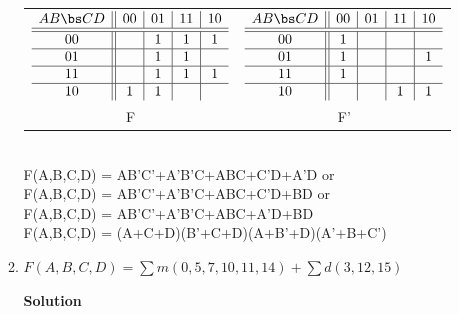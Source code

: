 \begin{enumerate}
\begin{enumerate}
\begin{onlysolution}
{                        \begin{tabular}{cc}
                            $
                            \begin{array} {c||c|c|c|c}
                                A B \bs C D   & 00 & 01 & 11 & 10 \\ \hline \hline
                                00        &    & 1  & 1  & 1  \\ \hline
                                01        &    & 1  & 1  &    \\ \hline
                                11        &    & 1  & 1  & 1  \\ \hline
                                10        & 1  & 1  &    &    \\
                            \end{array}$ &
                            $
                            \begin{array} {c||c|c|c|c}
                                A B \bs C D   & 00 & 01 & 11 & 10 \\ \hline \hline
                                00        & 1  &    &    &    \\ \hline
                                01        & 1  &    &    & 1  \\ \hline
                                11        & 1  &    &    &    \\ \hline
                                10        &    &    & 1  & 1  \\
                            \end{array}$ \\
                            F  & F' \\
                        \end{tabular} \\
                        \SOPmin F(A,B,C,D) = AB'C'+A'B'C+ABC+C'D+A'D  or \\
                        \SOPmin F(A,B,C,D) = AB'C'+A'B'C+ABC+C'D+BD  or \\
                        \SOPmin F(A,B,C,D) = AB'C'+A'B'C+ABC+A'D+BD \\
                        \POSmin F(A,B,C,D) =  (A+C+D)(B'+C+D)(A+B'+D)(A'+B+C')
                    }
                \end{onlysolution}
            \item  $F(A,B,C,D) = \sum m(0,5,7,10,11,14) + \sum d(3,12,15)$

                \begin{onlysolution}  \textbf{Solution} \itshape{

}
\end{onlysolution}
\end{enumerate}
\end{enumerate}
